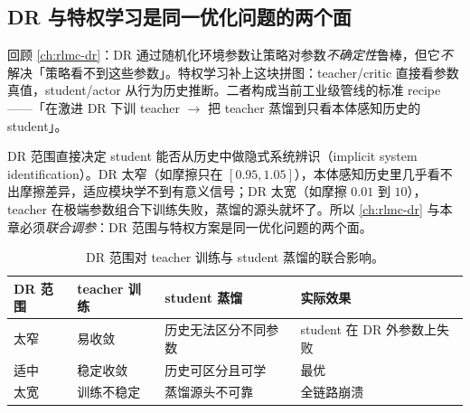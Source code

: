 \subsection{DR 与特权学习是同一优化问题的两个面}
\label{sec:rlmc-priv-dr}

回顾 \cref{ch:rlmc-dr}：DR 通过随机化环境参数让策略对参数\emph{不确定性}鲁棒，但它\emph{不}解决「策略看不到这些参数」。特权学习补上这块拼图：teacher/critic 直接看参数真值，student/actor 从行为历史推断。二者构成当前工业级管线的标准 recipe——「在激进 DR 下训 teacher $\to$ 把 teacher 蒸馏到只看本体感知历史的 student」。

\begin{insight}\label{ins:rlmc-priv-drsysid}
DR 范围直接决定 student 能否从历史中做隐式系统辨识（implicit system identification）。DR 太窄（如摩擦只在 $[0.95,1.05]$），本体感知历史里几乎看不出摩擦差异，适应模块学不到有意义信号；DR 太宽（如摩擦 $0.01$ 到 $10$），teacher 在极端参数组合下训练失败，蒸馏的源头就坏了。所以 \cref{ch:rlmc-dr} 与本章必须\emph{联合调参}：DR 范围与特权方案是同一优化问题的两个面。
\end{insight}

\begin{table}[H]
\centering
\small
\caption{DR 范围对 teacher 训练与 student 蒸馏的联合影响。}
\label{tab:rlmc-priv-drrange}
\begin{tabular}{@{}llll@{}}
\toprule
DR 范围 & teacher 训练 & student 蒸馏 & 实际效果 \\
\midrule
太窄 & 易收敛 & 历史无法区分不同参数 & student 在 DR 外参数上失败 \\
适中 & 稳定收敛 & 历史可区分且可学 & 最优 \\
太宽 & 训练不稳定 & 蒸馏源头不可靠 & 全链路崩溃 \\
\bottomrule
\end{tabular}
\end{table}


